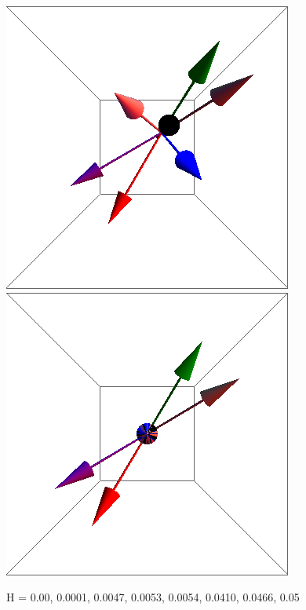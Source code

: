 \documentclass{article}
\begin{document}
\begin{figure}[ht]
\includegraphics[scale=0.22]{100/467S000to005R.png}
\includegraphics[scale=0.22]{100/501S000to005R.png}
\caption{H = 0.00, 0.0001, 0.0047, 0.0053, 0.0054, 0.0410, 0.0466, 0.05}
\end{figure}
\end{document}
